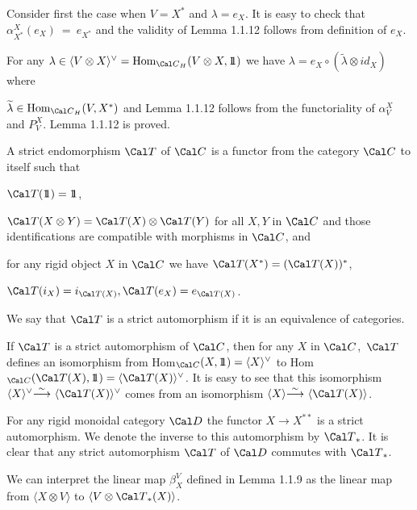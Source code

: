 Consider first the case when  $V = X^*$  and  $\lambda = e_X$.  It is easy to
check that  $\alpha^{X}_{X^*}(e_X)~=~e_{X^*}$  and the validity of Lemma 1.1.12
follows from definition of  $e_X$.

For any $\lambda \in \langle V \otimes X\rangle^\vee =
\text{Hom}_{{\Cal C}_H}(V \otimes X, \ident)$  we have $\lambda =
e_X \circ (\widetilde{\lambda} \otimes id_X)$ where

\noindent
$\widetilde{\lambda} \in \text{Hom}_{{\Cal C}_H}(V,X^*)$  and
Lemma 1.1.12 follows from the functoriality of  $\alpha^{X}_V$  and $P^X_V$.
Lemma 1.1.12 is proved.

  A strict endomorphism ${\Cal T}$ of ${\Cal
C}$
is a functor from the category ${\Cal C}$  to itself such that

  ${\Cal T}(\ident) = \ident$,

  ${\Cal T}(X \otimes Y) = {\Cal T}(X) \otimes {\Cal T}(Y)$  for
all  $X,Y$  in ${\Cal C}$  and those identifications are compatible
with morphisms in ${\Cal C}$, and

  for any rigid object $X$ in ${\Cal C}$  we have
${\Cal T}(X^*) = ({\Cal T}(X))^*$,

  ${\Cal T}(i_X) = i_{{\Cal T}(X)}, {\Cal T}(e_X)
= e_{{\Cal T}(X)}$.
\endproclaim

We say that  ${\Cal T}$  is a strict automorphism if it is an equivalence of
categories.

If  ${\Cal T}$  is a strict automorphism of ${\Cal C}$, then for any $X$ in
${\Cal C}$,\ ${\Cal T}$  defines an isomorphism from Hom$_{\Cal C}(X,\ident) =
\langle X\rangle^\vee$  to  Hom$_{\Cal C}({\Cal T}(X),\ident) =
\langle {\Cal T}(X)\rangle^\vee$.  It is easy to see that this isomorphism
$\langle X\rangle^\vee {\buildrel {\sim}\over\longrightarrow}\
\langle {\Cal T}(X)\rangle^\vee$  comes from an isomorphism
$\langle X\rangle {\buildrel {\sim}\over\longrightarrow}\
\langle {\Cal T}(X)\rangle$.

  For any rigid monoidal category ${\Cal D}$ the
functor
$X \to X^{**}$  is a strict automorphism.  We denote the inverse to this
automorphism by  ${\Cal T}_*$.  It
is clear that any strict automorphism ${\Cal T}$  of ${\Cal D}$  commutes with
${\Cal T}_*$.
\enddemo

  We can interpret the linear map $\beta^V_X$
defined
in Lemma 1.1.9 as the linear map from $\langle X \otimes V\rangle$
to $\langle V \otimes {\Cal T}_*(X)\rangle$.
\enddemo

